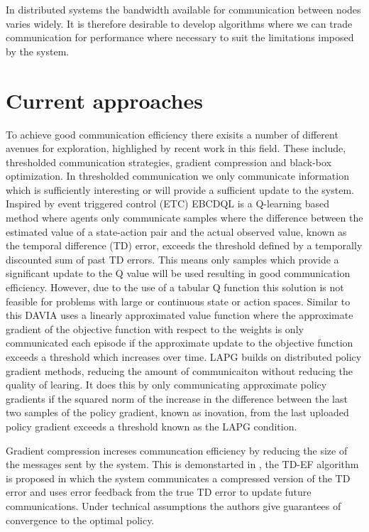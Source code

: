In distributed systems the bandwidth available for communication between nodes varies widely. It is therefore desirable to develop algorithms where we can trade communication for performance where necessary to suit the limitations imposed by the system.

\section{Current approaches}
\label{sec:CurrentApproaches}
To achieve good communication efficiency there exisits a number of different avenues for exploration, highlighed by recent work in this field. These include, thresholded communication strategies, gradient compression and black-box optimization.
In thresholded communication we only communicate information which is sufficiently interesting or will provide a sufficient update to the system. Inspired by event triggered control (ETC) EBCDQL \cite{EBCDQL} is a Q-learning based method where agents only communicate samples where the difference between the estimated value of a state-action pair and the actual observed value, known as the temporal difference (TD) error, exceeds the threshold defined by a temporally discounted sum of past TD errors. This means only samples which provide a significant update to the Q value will be used resulting in good communication efficiency. 
However, due to the use of a tabular Q function this solution is not feasible for problems with large or continuous state or action spaces.
Similar to this DAVIA \cite{DAVIA} uses a linearly approximated value function where the approximate gradient of the objective function with respect to the weights is only communicated each episode if the approximate update to the objective function exceeds a threshold which increases over time. 
LAPG \cite{LAPG} builds on distributed policy gradient methods, reducing the amount of communicaiton without reducing the quality of learing. It does this by only communicating approximate policy gradients if the squared norm of the increase in the difference between the last two samples of the policy gradient, known as inovation, from the last uploaded policy gradient exceeds a threshold known as the LAPG condition.

Gradient compression increses communcation efficiency by reducing the size of the messages sent by the system. This is demonstarted in \cite{TDCompression}, the TD-EF algorithm is proposed in which the system communicates a compressed version of the TD error and uses error feedback from the true TD error to update future communications. Under technical assumptions the authors give guarantees of convergence to the optimal policy.

